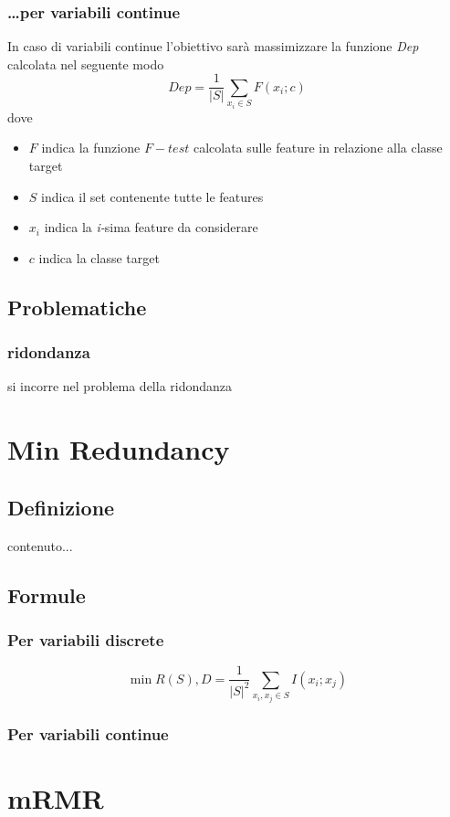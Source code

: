 \documentclass{beamer}
\begin{document}
\begin{frame}
	\frametitle{\dots per variabili continue}
	In caso di variabili continue l'obiettivo sarà massimizzare la funzione \emph{Dep} calcolata nel seguente modo
	$$Dep= \frac{1}{|S|} \sum\limits_{x_i \in S} F(x_i;c)$$
	dove 
	\begin{itemize}
		\item $F$ indica la funzione $F-test$ calcolata sulle feature in relazione alla classe target
		\item $S$ indica il set contenente tutte le features
		\item $x_i$ indica la \emph{i-}sima feature da considerare
		\item $c$ indica la classe target
	\end{itemize}
\end{frame}

\subsection{Problematiche}
\begin{frame}
	\frametitle{ridondanza}
	si incorre nel problema della ridondanza
\end{frame}

\section{Min Redundancy}
\subsection{Definizione}
\begin{frame}
	contenuto...
\end{frame}
\subsection{Formule}
\begin{frame}
	\frametitle{Per variabili discrete}
	$$\min R(S), D= \frac{1}{|S|^2} \sum\limits_{x_i,x_j \in S} I (x_i;x_j)$$
\end{frame}
\begin{frame}
	\frametitle{Per variabili continue}
\end{frame}


\section{mRMR}
\end{document}
